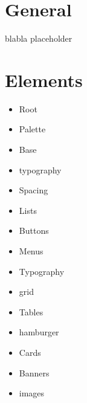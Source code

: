 \section{General}%
\label{sec:general}

blabla placeholder

\section{Elements}%
\label{sec:elements}

\begin{itemize}
	\item Root
	\item Palette
	\item Base
	\item typography
	\item Spacing
	\item Lists
	\item Buttons
	\item Menus
	\item Typography
	\item grid
	\item Tables
	\item hamburger
	\item Cards
	\item Banners
	\item images
\end{itemize}
